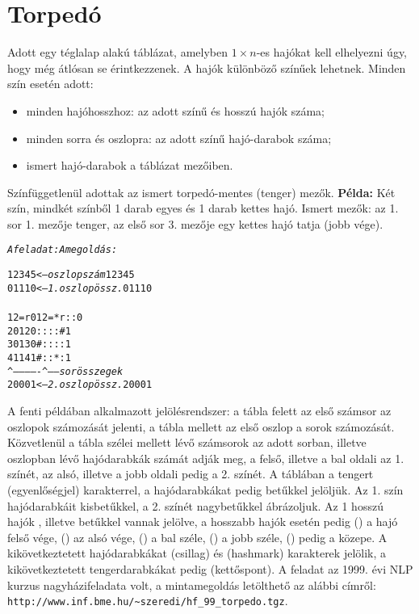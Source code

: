 \section{Torpedó}

Adott egy téglalap alakú táblázat, amelyben $1 \times n$-es hajókat kell elhelyezni
úgy, hogy még átlósan se érintkezzenek. A hajók különböző színűek lehetnek. Minden
szín esetén adott:
\begin{itemize}
\item minden hajóhosszhoz: az adott színű és hosszú hajók száma;
\item minden sorra és oszlopra: az adott színű hajó-darabok száma;
\item ismert hajó-darabok a táblázat mezőiben.
\end{itemize}
Színfüggetlenül adottak az ismert torpedó-mentes (tenger) mezők.
\br
{\bf Példa:} Két szín, mindkét színből 1 darab egyes és 1 darab kettes hajó.
Ismert mezők: az 1. sor 1. mezője tenger, az első sor 3. mezője egy kettes
hajó tatja (jobb vége).

\begin{alltt}
     {\rm \em A feladat:}                                     {\rm \em A megoldás:}
\end{alltt}
\begin{alltt}
      1 2 3 4 5     <-- {\em oszlopszám     }              1 2 3 4 5
      0 1 1 1 0     <-- {\em 1. oszlopössz. }              0 1 1 1 0
                        {\em                }
1  2  =   r      0      {\em                }        1  2  = * r : :  0
2  0             1      {\em                }        2  0  : : : : #  1
3  0             1      {\em                }        3  0  # : : : :  1
4  1             1      {\em                }        4  1  # : : * :  1
   ^-------------^------{\em sorösszegek    }
      2 0 0 0 1     <-- {\em 2. oszlopössz. }              2 0 0 0 1
\end{alltt}

A fenti példában alkalmazott jelölésrendszer: a tábla felett az első számsor az
oszlopok számozását jelenti, a tábla mellett az első oszlop a sorok számozását.
Közvetlenül a tábla szélei mellett lévő számsorok az adott sorban, illetve oszlopban
lévő hajódarabkák számát adják meg, a felső, illetve a bal oldali az 1. színét,
az alsó, illetve a jobb oldali pedig a 2. színét. A táblában a tengert \cd{=}
(egyenlőségjel) karakterrel, a hajódarabkákat pedig betűkkel jelöljük. Az 1. szín
hajódarabkáit kisbetűkkel, a 2. színét nagybetűkkel ábrázoljuk. Az 1 hosszú hajók
, illetve  betűkkel vannak jelölve, a hosszabb hajók esetén pedig 
() a hajó felső vége,  () az alsó vége,  () a bal széle,
 () a jobb széle,  () pedig a közepe. A kikövetkeztetett
hajódarabkákat \cd{*} (csillag) és \cd{\#} (hashmark) karakterek jelölik, a
kikövetkeztetett tengerdarabkákat pedig \cd{:} (kettőspont).
\br
A feladat az 1999. évi NLP kurzus nagyházifeladata volt, a mintamegoldás letölthető
az alábbi címről: \verb'http://www.inf.bme.hu/~szeredi/hf_99_torpedo.tgz'.

